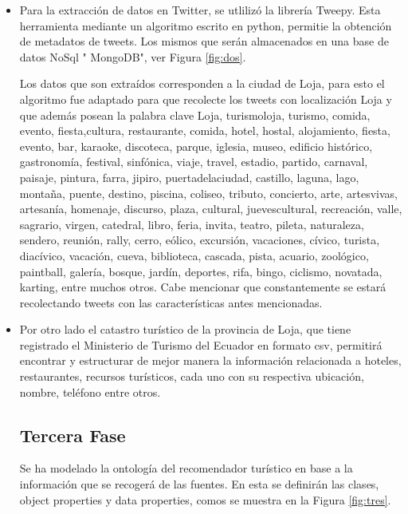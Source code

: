 \documentclass[lnbip,sechang,a4paper]{svmultln}
\begin{document}
\begin{itemize}
   \item Para la extracción de datos en Twitter, se utlilizó la librería Tweepy. Esta herramienta mediante un algoritmo escrito en python, permitie la obtención de metadatos de tweets. Los mismos que serán almacenados en una base de datos NoSql " MongoDB", ver Figura \ref{fig:dos}.
    
    
    Los datos que son extraídos corresponden a la ciudad de Loja, para esto el algoritmo fue adaptado para que recolecte los tweets con localización Loja y que además posean la palabra clave Loja, turismoloja, turismo, comida, evento, fiesta,cultura, restaurante, comida, hotel, hostal, alojamiento, fiesta, evento, bar, karaoke, discoteca, parque, iglesia, museo, edificio histórico, gastronomía, festival, sinfónica, viaje, travel,  estadio, partido, carnaval, paisaje, pintura, farra, jipiro, puertadelaciudad, castillo, laguna, lago, montaña, puente, destino, piscina, coliseo, tributo, concierto, arte, artesvivas, artesanía, homenaje, discurso, plaza, cultural, juevescultural, recreación, valle, sagrario, virgen, catedral, libro, feria, invita, teatro, pileta, naturaleza, sendero, reunión, rally, cerro, eólico, excursión, vacaciones, cívico, turista, diacívico, vacación, cueva, biblioteca, cascada, pista, acuario, zoológico, paintball, galería, bosque, jardín, deportes, rifa, bingo, ciclismo, novatada, karting, entre muchos otros. Cabe mencionar que constantemente se estará recolectando tweets con las características antes mencionadas.    
    
\item Por otro lado el catastro turístico de la provincia de Loja,  que tiene registrado el Ministerio de Turismo del Ecuador en formato csv, permitirá encontrar y estructurar de mejor manera la información relacionada a hoteles, restaurantes, recursos turísticos, cada uno con su respectiva ubicación, nombre, teléfono entre otros.


    


\subsection{Tercera Fase}

Se ha modelado la ontología del recomendador turístico en base a la información que se recogerá de las fuentes. En esta se definirán las clases, object properties y data properties, comos se muestra en la Figura \ref{fig:tres}. 


\end{itemize}
\end{document}
